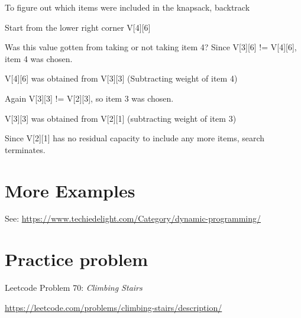 \documentclass{article}
\begin{document}
To figure out which items were included in the knapsack, backtrack

Start from the lower right corner V[4][6]

Was this value gotten from taking or not taking item 4? Since V[3][6] != V[4][6], item 4 was chosen.

V[4][6] was obtained from V[3][3] (Subtracting weight of item 4)

Again V[3][3] != V[2][3], so item 3 was chosen.

V[3][3] was obtained from V[2][1] (subtracting weight of item 3)

Since V[2][1] has no residual capacity to include any more items, search terminates.



\section{More Examples}

See: \url{https://www.techiedelight.com/Category/dynamic-programming/}

\section{Practice problem}
Leetcode Problem 70: \textit{Climbing Stairs}

\url{https://leetcode.com/problems/climbing-stairs/description/}
\end{document}
